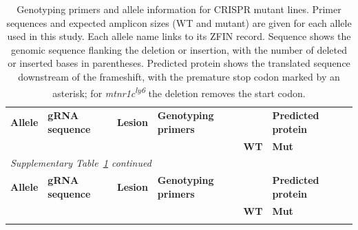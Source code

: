 \documentclass[9.5pt]{RandlettLab_elife}            %
\begin{document}
{\scriptsize
\setlength{\tabcolsep}{3pt}
\begin{longtable}{@{}
  l                       %
  >{\ttfamily}p{2.5cm}     %
  >{\ttfamily}p{4.4cm}    %
  >{\ttfamily}p{3.15cm}    %
  >{\ttfamily}p{0.7cm}   %
  >{\ttfamily}p{0.7cm}   %
  >{\ttfamily}p{3.6cm}    %
@{}}

\caption{Genotyping primers and allele information for CRISPR mutant lines.
Primer sequences and expected amplicon sizes
(WT and mutant) are given for each allele used in this study.
Each allele name links to its ZFIN record.
Sequence shows the genomic sequence flanking the deletion or insertion,
with the number of deleted or inserted bases in parentheses.
Predicted protein shows the translated sequence downstream of the frameshift,
with the premature stop codon marked by an asterisk; for \emph{mtnr1c}\textsuperscript{\emph{ly6}}
the deletion removes the start codon.}
\label{supptab:primers}\\

\toprule
\footnotesize\textbf{Allele}
  & \normalfont\footnotesize\textbf{gRNA sequence}
  & \normalfont\footnotesize\textbf{Lesion}
  & \normalfont\footnotesize\textbf{Genotyping primers}
  & \multicolumn{2}{l}{\footnotesize\textbf{Amplicon Size}}
  & \normalfont\footnotesize\textbf{Predicted protein} \\
  & & & & \footnotesize\textbf{WT} & \footnotesize\textbf{Mut} & \\
\midrule
\endfirsthead

\multicolumn{7}{l}{\textit{Supplementary Table~\ref{supptab:primers} continued}}\\[2pt]
\toprule
\footnotesize\textbf{Allele}
  & \normalfont\footnotesize\textbf{gRNA sequence}
  & \normalfont\footnotesize\textbf{Lesion}
  & \normalfont\footnotesize\textbf{Genotyping primers}
  & \multicolumn{2}{l}{\footnotesize\textbf{Amplicon Size}}
  & \normalfont\footnotesize\textbf{Predicted protein} \\
  & & & & \footnotesize\textbf{WT} & \footnotesize\textbf{Mut} & \\
\midrule
\endhead

\endfoot

\bottomrule
\endlastfoot


\end{longtable}}
\end{document}

